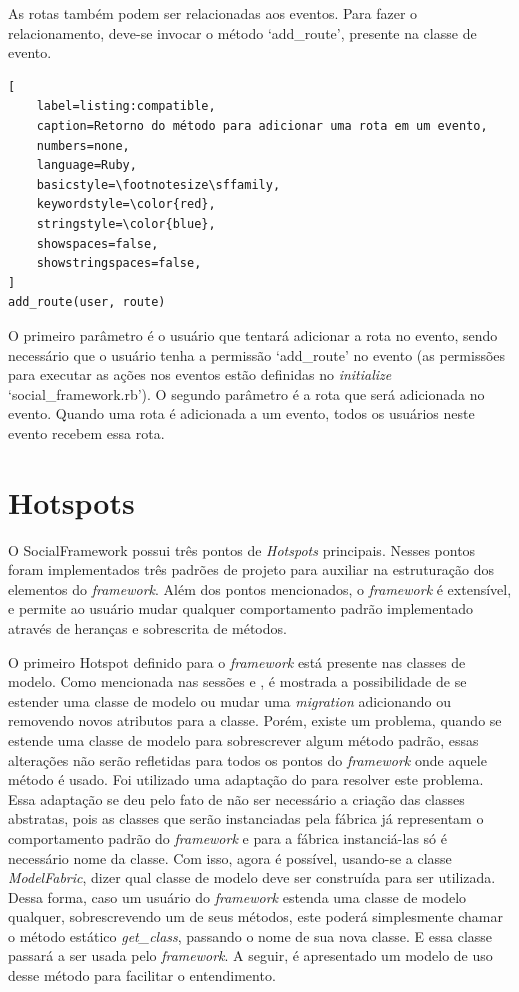 As rotas também podem ser relacionadas aos eventos. Para fazer o relacionamento, deve-se invocar o método `add\_route', presente na classe de evento.

\begin{lstlisting}[
    label=listing:compatible,
    caption=Retorno do método para adicionar uma rota em um evento,
    numbers=none,
    language=Ruby,
    basicstyle=\footnotesize\sffamily,
    keywordstyle=\color{red},
    stringstyle=\color{blue},
    showspaces=false,
    showstringspaces=false,
]
add_route(user, route)
\end{lstlisting}

O primeiro parâmetro é o usuário que tentará adicionar a rota no evento, sendo necessário que o usuário tenha a permissão `add\_route' no evento (as permissões para executar as ações nos eventos estão definidas no \textit{initialize} `social\_framework.rb'). O segundo parâmetro é a rota que será adicionada no evento. Quando uma rota é adicionada a um evento, todos os usuários neste evento recebem essa rota.

\section{Hotspots}
\label{sec:hotspots}

O SocialFramework possui três pontos de \textit{Hotspots} principais. Nesses pontos foram implementados três padrões de projeto para auxiliar na estruturação dos elementos do \textit{framework}. Além dos pontos mencionados, o \textit{framework} é extensível, e permite ao usuário mudar qualquer comportamento padrão implementado através de heranças e sobrescrita de métodos.

O primeiro Hotspot definido para o \textit{framework} está presente nas classes de modelo. Como mencionada nas sessões  e , é mostrada a possibilidade de se estender uma classe de modelo ou mudar uma \textit{migration} adicionando ou removendo novos atributos para a classe. Porém, existe um problema, quando se estende uma classe de modelo para sobrescrever algum método padrão, essas alterações não serão refletidas para todos os pontos do \textit{framework} onde aquele método é usado. Foi utilizado uma adaptação do  para resolver este problema. Essa adaptação se deu pelo fato de não ser necessário a criação das classes abstratas, pois as classes que serão instanciadas pela fábrica já representam o comportamento padrão do \textit{framework} e para a fábrica instanciá-las só é necessário nome da classe. Com isso, agora é possível, usando-se a classe \textit{ModelFabric}, dizer qual classe de modelo deve ser construída para ser utilizada. Dessa forma, caso um usuário do \textit{framework} estenda uma classe de modelo qualquer, sobrescrevendo um de seus métodos, este poderá simplesmente chamar o método estático \textit{get\_class}, passando o nome de sua nova classe. E essa classe passará a ser usada pelo \textit{framework}. A seguir, é apresentado um modelo de uso desse método para facilitar o entendimento.

